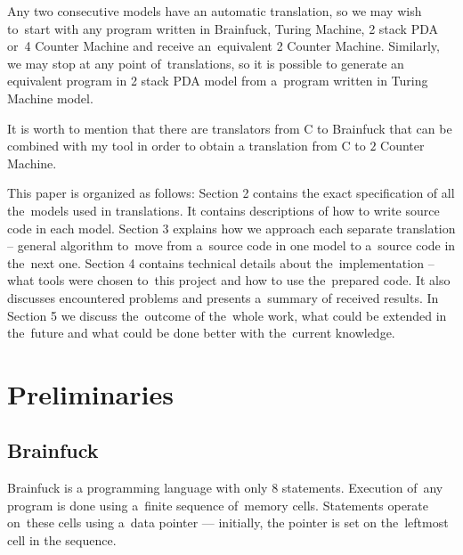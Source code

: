 \documentclass[english,shortabstract,mgr]{iithesis}
\begin{document}
Any two consecutive models have an automatic translation, so we may wish to~start with any program written
in Brainfuck, Turing Machine, 2 stack PDA or~4 Counter Machine and receive an~equivalent 2 Counter Machine.
Similarly, we may stop at any point of~translations, so it is possible to generate an equivalent program
in 2 stack PDA model from a~program written in Turing Machine model.

It is worth to mention that there are translators from C to Brainfuck that can
be combined with my tool in order to obtain a translation from C to $2$ Counter
Machine.

This paper is organized as follows: Section 2 contains the exact specification of all the~models used in translations.
It contains descriptions of how to write source code in each model. Section 3
explains how we approach each separate translation -- general algorithm to~move from a~source code in one model
to a~source code in the~next one. Section 4 contains technical details about the~implementation -- what tools
were chosen to~this project and how to use the~prepared code. It also discusses encountered problems and presents
a~summary of received results. In Section 5 we discuss the~outcome of the~whole work, what could be extended in the~future
and what could be done better with the~current knowledge.


\chapter {Preliminaries}

\section {Brainfuck}

Brainfuck is a programming language with only $8$ statements. Execution
of~any program is done using a~finite sequence of~memory cells. Statements
operate on~these cells using a~data pointer --- initially, the pointer is set
on the~leftmost cell in the sequence.
\end{document}
